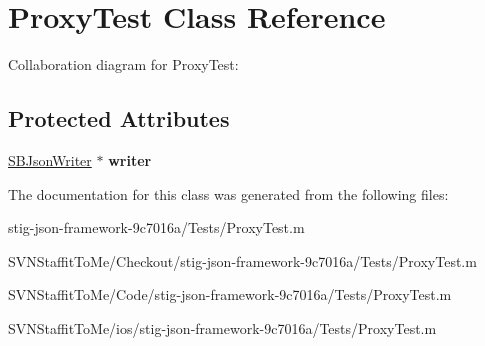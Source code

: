 \hypertarget{interface_proxy_test}{
\section{\-Proxy\-Test \-Class \-Reference}
\label{interface_proxy_test}
}


\-Collaboration diagram for \-Proxy\-Test\-:
\subsection*{\-Protected \-Attributes}
\begin{DoxyCompactItemize}
\item 
\hypertarget{interface_proxy_test_a53a9a7bc33d0c329265934f00a37e8eb}{
\hyperlink{interface_s_b_json_writer}{\-S\-B\-Json\-Writer} $\ast$ {\bfseries writer}}
\label{interface_proxy_test_a53a9a7bc33d0c329265934f00a37e8eb}

\end{DoxyCompactItemize}


\-The documentation for this class was generated from the following files\-:\begin{DoxyCompactItemize}
\item 
stig-\/json-\/framework-\/9c7016a/\-Tests/\-Proxy\-Test.\-m\item 
\-S\-V\-N\-Staffit\-To\-Me/\-Checkout/stig-\/json-\/framework-\/9c7016a/\-Tests/\-Proxy\-Test.\-m\item 
\-S\-V\-N\-Staffit\-To\-Me/\-Code/stig-\/json-\/framework-\/9c7016a/\-Tests/\-Proxy\-Test.\-m\item 
\-S\-V\-N\-Staffit\-To\-Me/ios/stig-\/json-\/framework-\/9c7016a/\-Tests/\-Proxy\-Test.\-m\end{DoxyCompactItemize}
